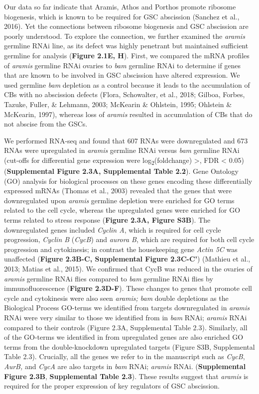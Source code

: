 \documentclass[12pt,twoside]{reedthesis}
\begin{document}
Our data so far indicate that Aramis, Athos and Porthos promote ribosome
biogenesis, which is known to be required for GSC abscission
(Sanchez et al., 2016). Yet the connections between ribosome biogenesis and
GSC abscission are poorly understood. To explore the connection, we
further examined the \emph{aramis} germline RNAi line, as its defect was
highly penetrant but maintained sufficient germline for analysis
(\textbf{Figure 2.1E, H}). First, we compared the mRNA profiles of \emph{aramis}
germline RNAi ovaries to \emph{bam} germline RNAi to determine if genes that
are known to be involved in GSC abscission have altered expression. We
used germline \emph{bam} depletion as a control because it leads to the
accumulation of CBs with no abscission defects (Flora, Schowalter, et al., 2018; Gilboa, Forbes, Tazuke, Fuller, \& Lehmann, 2003; McKearin \& Ohlstein, 1995; Ohlstein \& McKearin, 1997), whereas loss of \emph{aramis}
resulted in accumulation of CBs that do not abscise from the GSCs.

We performed RNA-seq and found that 607 RNAs were downregulated and 673
RNAs were upregulated in \emph{aramis} germline RNAi versus \emph{bam} germline
RNAi (cut-offs for differential gene expression were log\textsubscript{2}(foldchange)
\textgreater{}\textbar, FDR \textless{} 0.05) (\textbf{Supplemental Figure 2.3A, Supplemental Table 2.2}). Gene
Ontology (GO) analysis for biological processes on these genes encoding
these differentially expressed mRNAs
(Thomas et al., 2003) revealed that the genes that were
downregulated upon \emph{aramis} germline depletion were enriched for GO
terms related to the cell cycle, whereas the upregulated genes were
enriched for GO terms related to stress response (\textbf{Figure 2.3A, Figure
S3B}). The downregulated genes included \emph{Cyclin A}, which is required
for cell cycle progression, \emph{Cyclin B} (\emph{CycB}) and \emph{aurora B}, which
are required for both cell cycle progression and cytokinesis; in
contrast the housekeeping gene \emph{Actin 5C} was unaffected (\textbf{Figure 2.3B-C,
Supplemental Figure 2.3C-C'}) (Mathieu et al., 2013; Matias et al., 2015). We confirmed that
CycB was reduced in the ovaries of \emph{aramis} germline RNAi flies compared
to \emph{bam} germline RNAi flies by immunofluorescence (\textbf{Figure 2.3D-F}).
These changes to genes that promote cell cycle and cytokinesis were also
seen \emph{aramis; bam} double depletions as the Biological Process GO-terms
we identified from targets downregulated in \emph{aramis} RNAi were very
similar to those we identified from in \emph{bam} RNAi; \emph{aramis} RNAi
compared to their controls (Figure 2.3A, Supplemental Table 2.3). Similarly,
all of the GO-terms we identified in from upregulated genes are also
enriched GO terms from the double-knockdown upregulated targets (Figure
S3B, Supplemental Table 2.3). Crucially, all the genes we refer to in the
manuscript such as \emph{CycB}, \emph{AurB,} and \emph{CycA} are also targets in \emph{bam}
RNAi; \emph{aramis} RNAi. (\textbf{Supplemental Figure 2.3B}, \textbf{Supplemental Table 2.3}). These
results suggest that \emph{aramis} is required for the proper expression of
key regulators of GSC abscission.
\end{document}
